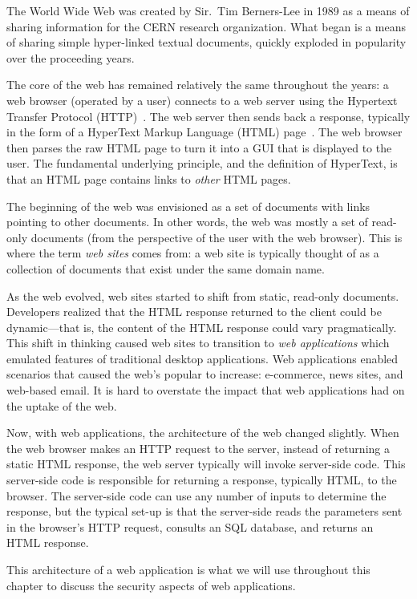 The World Wide Web was created by Sir.\ Tim Berners-Lee in 1989 as a
means of sharing information for the CERN research organization. What
began is a means of sharing simple hyper-linked textual documents,
quickly exploded in popularity over the proceeding years.

The core of the web has remained relatively the same throughout the
years: a web browser (operated by a user) connects to a web server
using the Hypertext Transfer Protocol (HTTP)~\cite{fielding99:http11}.
The web server then sends back a response, typically in the form of a
HyperText Markup Language (HTML) page~\cite{berjon14:html5}. The web
browser then parses the raw HTML page to turn it into a GUI that is
displayed to the user. The fundamental underlying principle, and the
definition of HyperText, is that an HTML page contains links to
\emph{other} HTML pages.

The beginning of the web was envisioned as a set of documents with
links pointing to other documents. In other words, the web was mostly
a set of read-only documents (from the perspective of the user with
the web browser). This is where the term \emph{web sites} comes from:
a web site is typically thought of as a collection of documents that
exist under the same domain name.

As the web evolved, web sites started to shift from static, read-only
documents. Developers realized that the HTML response returned to the
client could be dynamic---that is, the content of the HTML response
could vary pragmatically. This shift in thinking caused web sites to
transition to \emph{web applications} which emulated features of
traditional desktop applications. Web applications enabled scenarios
that caused the web's popular to increase: e-commerce, news sites, and
web-based email. It is hard to overstate the impact that web
applications had on the uptake of the web. 

Now, with web applications, the architecture of the web changed
slightly. When the web browser makes an HTTP request to the server,
instead of returning a static HTML response, the web server typically
will invoke server-side code. This server-side code is responsible for
returning a response, typically HTML, to the browser. The server-side
code can use any number of inputs to determine the response, but the
typical set-up is that the server-side reads the parameters sent in
the browser's HTTP request, consults an SQL database, and returns an
HTML response. 

This architecture of a web application is what we will use throughout
this chapter to discuss the security aspects of web applications.

